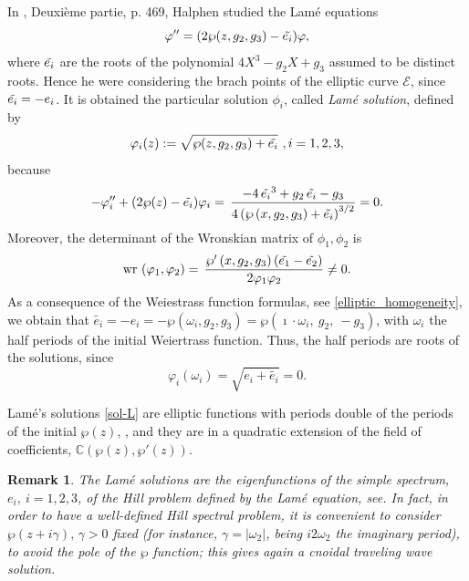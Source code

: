 \documentclass[a4paper,12pt]{article}
\newcommand{\cE}{\mathcal{E}}
\newcommand{\tw}{\textrm{wr }}
\newtheorem{rem}[thm]{Remark}
\begin{document}
In \cite{HALP}, Deuxi\`eme partie, p. 469, Halphen studied the  Lam\'e equations
\begin{equation} \label{eq:hLame}
\varphi''=(2\wp(z, g_2 , g_3 )-\Tilde{e_i })\varphi ,
\end{equation}
where $\Tilde{e_i }$ are the roots of the polynomial $4X^3-g_2 X +g_3$ assumed to be distinct roots. Hence he were considering the brach points of the elliptic curve $\cE$, since $ \Tilde{e_i }=-e_i  $. It is obtained the  particular solution $\phi_i$, called {\it Lam\'e solution}, defined by
\begin{equation}\label{sol-L} 
    \varphi_i  (z) :=\sqrt{\wp(z, g_2 , g_3 ) +\Tilde{e_i }} \ , i = 1, 2, 3,
\end{equation}
because 
\begin{equation}
- \varphi_i''+(2\wp(z)-\Tilde{e_i } )\varphi_i   
=
\,{\frac {-4\,\Tilde{e_i }^{3}+{ g_2 }\,\Tilde{e_i }-{ g_3 }}{4 \left( 
\wp \left( x,{ g_2 },{ g_3 } \right) +\Tilde{e_i } \right) 
^{3/2}}} =0 .
\end{equation}
Moreover, the determinant of the Wronskian matrix of $\phi_1 , \phi_2$ is 
\begin{equation*}
   \tw ( \varphi_1 , \varphi_2 ) = 
   \,\frac {{ \wp}' \left( x,{ g_2 },{ g_3 }\right)  \left( \Tilde{e_1 } -\Tilde{e_2 } \right) }{2\varphi_1 \varphi_2 }
\not=0 .
\end{equation*}
As a consequence of the Weiestrass function  formulas, see \eqref{elliptic_homogeneity}, we obtain that $\tilde{e_i } = -e_i =- \wp (\omega_i , g_2 ,g_3 ) = \wp (\imath \cdot  \omega_i , \  g_2 , \  -g_3 )$, with $\omega_i$ the half periods of the initial Weiertrass function. Thus, the half periods are roots of the solutions, since
\begin{equation*}
    \varphi_i (\omega_i ) = \sqrt{e_i + \tilde{e_i } }=0 .
\end{equation*}



Lam\'e's solutions \eqref{sol-L} are elliptic functions with periods double of the periods of the initial $ \wp (z) $, \cite{HALP, POO}, and  they are in a quadratic extension of the field of coefficients, $ \mathbb{C} (\wp (z), \wp '(z)) $. 

\begin{rem}
 The Lam\'e solutions are the eigenfunctions of the simple spectrum, $ e_i , \  i=1,2,3 $, of the Hill problem defined by the Lam\'e equation,  see\cite{WW}. In fact,  in order to have a well-defined Hill spectral problem,  it is convenient to consider $\wp (z+i\gamma),\, \gamma>0$ fixed (for instance, $\gamma=|\omega_2|$, being $i2\omega_2$ the imaginary period), to avoid the pole of the $\wp $ function;  this gives  again a cnoidal traveling wave solution.
   
\end{rem}
\end{document}
